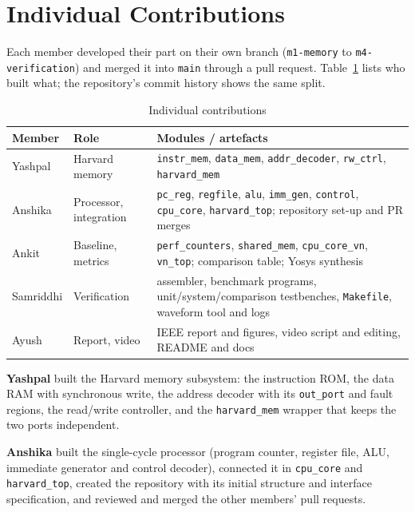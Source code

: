 \documentclass[conference]{IEEEtran}
\newcommand{\sig}[1]{\texttt{#1}}
\begin{document}
\section{Individual Contributions}
Each member developed their part on their own branch (\sig{m1-memory} to \sig{m4-verification})
and merged it into \sig{main} through a pull request. Table~\ref{tab:contrib} lists who built what;
the repository's commit history shows the same split.

\begin{table}[t]
  \caption{Individual contributions}
  \label{tab:contrib}
  \centering
  \footnotesize
  \begin{tabular}{@{}l>{\raggedright}p{1.45cm}>{\raggedright\arraybackslash}p{4.1cm}@{}}
    \toprule
    Member & Role & Modules / artefacts \\
    \midrule
    Yashpal   & Harvard memory & \sig{instr\_mem}, \sig{data\_mem}, \sig{addr\_decoder},
                \sig{rw\_ctrl}, \sig{harvard\_mem} \\
    Anshika   & Processor, integration & \sig{pc\_reg}, \sig{regfile}, \sig{alu}, \sig{imm\_gen},
                \sig{control}, \sig{cpu\_core}, \sig{harvard\_top}; repository set-up and PR merges \\
    Ankit     & Baseline, metrics & \sig{perf\_counters}, \sig{shared\_mem}, \sig{cpu\_core\_vn},
                \sig{vn\_top}; comparison table; Yosys synthesis \\
    Samriddhi & Verification & assembler, benchmark programs, unit/system/comparison testbenches,
                \sig{Makefile}, waveform tool and logs \\
    Ayush     & Report, video & IEEE report and figures, video script and editing, README and docs \\
    \bottomrule
  \end{tabular}
\end{table}

\textbf{Yashpal} built the Harvard memory subsystem: the instruction ROM, the data RAM with
synchronous write, the address decoder with its \sig{out\_port} and fault regions, the read/write
controller, and the \sig{harvard\_mem} wrapper that keeps the two ports independent.

\textbf{Anshika} built the single-cycle processor (program counter, register file, ALU,
immediate generator and control decoder), connected it in \sig{cpu\_core} and
\sig{harvard\_top}, created the repository with its initial structure and interface
specification, and reviewed and merged the other members' pull requests.
\end{document}
